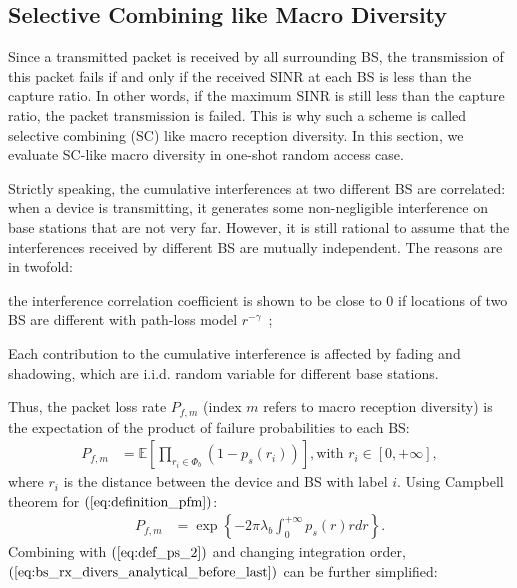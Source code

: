 \subsection{Selective Combining like Macro Diversity}
\label{sec:sc_macro_diversity}
Since a transmitted packet is received by all surrounding BS, the transmission of this packet fails if and only if the received SINR at each BS is less than the capture ratio. In other words, if the maximum SINR is still less than the capture ratio, the packet transmission is failed. This is why such a scheme is called selective combining (SC) like macro reception diversity. In this section, we evaluate SC-like macro diversity in one-shot random access case.

Strictly speaking, the cumulative interferences at two different BS are correlated: when a device is transmitting, it generates some non-negligible interference on base stations that are not very far. However, it is still rational to assume that the interferences received by different BS are mutually independent.
The reasons are in twofold:\begin{inparaenum}[1)]
	\item the interference correlation coefficient is shown to be close to $0$ if locations of two BS are different with path-loss model $r^{-\gamma}$~\cite[lemma 3.5]{haenggi2009interference}; 
	\item Each contribution to the cumulative interference is affected by fading and shadowing, which are i.i.d. random variable for different base stations.
\end{inparaenum}
Thus, the packet loss rate $P_{f,m}$ (index $m$ refers to macro reception diversity) is the expectation of the product of failure probabilities to each BS:
\begin{align}
\label{eq:definition_pfm}
P_{f,m} &= \mathbb{E}\left[  \prod_{r_i \in \Phi_{b}} (1-p_{s}(r_i)) \right], \text{with } r_i \in \left[0, +\infty\right],
\end{align} 
where $r_i$ is the distance between the device and BS with label $i$. Using Campbell theorem for  $(\ref{eq:definition_pfm})$:
\begin{align}
\label{eq:bs_rx_divers_analytical_before_last}
P_{f,m} &= \exp\left\lbrace -2\pi \lambda_{b} \int_{0}^{+\infty} p_{s}(r)rdr \right\rbrace.
\end{align} 
Combining with $(\ref{eq:def_ps_2})$ and changing integration order, $(\ref{eq:bs_rx_divers_analytical_before_last})$ can be further simplified:
